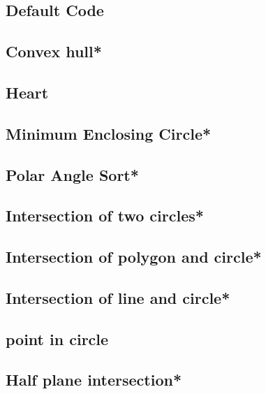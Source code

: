 \subsection{Default Code}

\subsection{Convex hull*} %

\subsection{Heart}

\subsection{Minimum Enclosing Circle*} %

\subsection{Polar Angle Sort*} %

\subsection{Intersection of two circles*} %

\subsection{Intersection of polygon and circle*} %

\subsection{Intersection of line and circle*} %

\subsection{point in circle}

\subsection{Half plane intersection*} %

